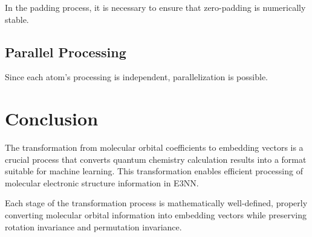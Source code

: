 \documentclass[12pt]{article}
\begin{document}
In the padding process, it is necessary to ensure that zero-padding is numerically stable.

\subsection{Parallel Processing}

Since each atom's processing is independent, parallelization is possible.

\section{Conclusion}

The transformation from molecular orbital coefficients to embedding vectors is a crucial process that converts quantum chemistry calculation results into a format suitable for machine learning. This transformation enables efficient processing of molecular electronic structure information in E3NN.

Each stage of the transformation process is mathematically well-defined, properly converting molecular orbital information into embedding vectors while preserving rotation invariance and permutation invariance.
\end{document}
